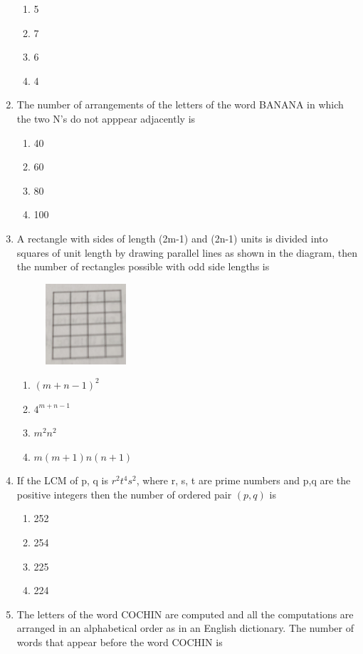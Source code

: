 \begin{enumerate}[label=\arabic*.,ref=\thesubsection.\theenumi]
\begin{enumerate}
\item 5
\item 7
\item 6
\item 4\\
\end{enumerate}
\item The number of arrangements of the letters of the word BANANA in which the two N's do not apppear adjacently is
\begin{enumerate}
\item 40
\item 60
\item 80
\item 100\\
\end{enumerate}
\item A rectangle with sides of length (2m-1) and (2n-1) units is divided into squares of unit length by drawing parallel lines as shown in the diagram, then the number of rectangles possible with odd side lengths is
\begin{figure}
	\includegraphics[width=30mm,scale=0.5]{./figs/a.eps} 
\end{figure}
\begin{enumerate}
\item $(m+n-1)^2$
\item $4^{m+n-1}$
\item $m^2n^2$
\item $m(m+1)n(n+1)$\\
\end{enumerate}
\item If the LCM of p, q is $r^2t^4s^2$, where r, s, t are prime numbers and p,q are the positive integers then the number of ordered pair $(p,q)$ is
\begin{enumerate}
\item 252
\item 254
\item 225
\item 224\\
\end{enumerate}
\item The letters of the word COCHIN are computed and all the computations are arranged in an alphabetical order as in an English dictionary. The number of words that appear before the word COCHIN is 

\end{enumerate}
